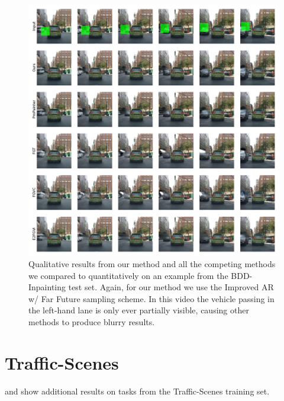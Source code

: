 \begin{figure}[h]
\begin{center}
    \centering
    \captionsetup{type=figure}
    \includegraphics[width=\linewidth]{figures/additional-samples/taxi_all.pdf}
    \caption{Qualitative results from our method and all the competing methods we compared to quantitatively on an example from the BDD-Inpainting test set. Again, for our method we use the Improved AR w/ Far Future sampling scheme. In this video the vehicle passing in the left-hand lane is only ever partially visible, causing other methods to produce blurry results. }
    \label{fig:taxi}
\end{center}
\end{figure}
\section{Traffic-Scenes}
 and  show additional results on tasks from the Traffic-Scenes training set.

